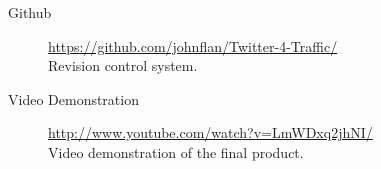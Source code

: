\begin{description}
    \item[Github] \url{https://github.com/johnflan/Twitter-4-Traffic/} \hfill \\
        Revision control system.
    \item[Video Demonstration] \url{http://www.youtube.com/watch?v=LmWDxq2jhNI/} \hfill \\
        Video demonstration of the final product.
\end{description}
